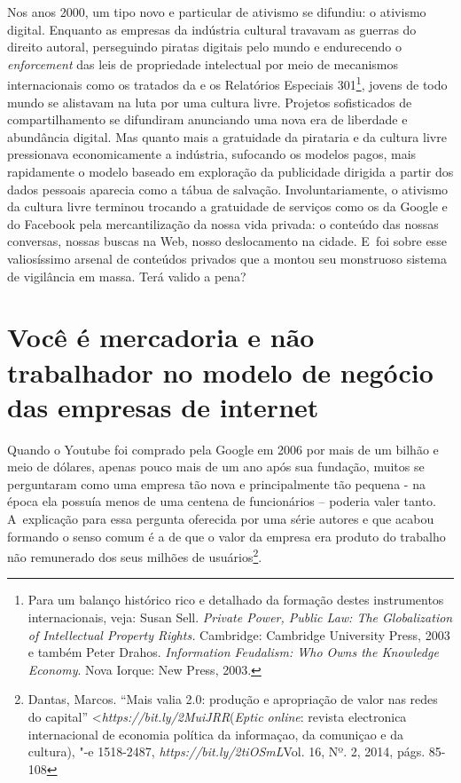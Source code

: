 Nos anos 2000, um tipo novo e particular de ativismo se difundiu: o
ativismo digital. Enquanto as empresas da indústria cultural travavam as
guerras do direito autoral, perseguindo piratas digitais pelo mundo e
endurecendo o \emph{enforcement} das leis de propriedade intelectual por
meio de mecanismos internacionais como os tratados da  e os
Relatórios Especiais 301\footnote{Para um balanço
  histórico rico e detalhado da formação destes instrumentos
  internacionais, veja: Susan Sell. \emph{Private Power, Public Law: The
  Globalization of Intellectual Property Rights.} Cambridge: Cambridge
  University Press, 2003 e também Peter Drahos. \emph{Information
  Feudalism: Who Owns the Knowledge Economy}. Nova Iorque: New Press,
  2003.}, jovens de todo mundo se alistavam na luta por uma cultura
livre. Projetos sofisticados de compartilhamento se difundiram
anunciando uma nova era de liberdade e abundância digital. Mas quanto
mais a gratuidade da pirataria e da cultura livre pressionava
economicamente a indústria, sufocando os modelos pagos, mais rapidamente
o modelo baseado em exploração da publicidade dirigida a partir dos
dados pessoais aparecia como a tábua de salvação. Involuntariamente, o
ativismo da cultura livre terminou trocando a gratuidade de serviços
como os da Google e do Facebook pela mercantilização da nossa vida
privada: o conteúdo das nossas conversas, nossas buscas na Web, nosso
deslocamento na cidade. E~foi sobre esse valiosíssimo arsenal de
conteúdos privados que a  montou seu monstruoso sistema de vigilância
em massa. Terá valido a pena?

\section{Você é mercadoria e não trabalhador no modelo de negócio das
empresas de internet}

Quando o Youtube foi comprado pela Google em 2006 por mais de um bilhão
e meio de dólares, apenas pouco mais de um ano após sua fundação, muitos
se perguntaram como uma empresa tão nova e principalmente tão pequena -
na época ela possuía menos de uma centena de funcionários -- poderia
valer tanto. A~explicação para essa pergunta oferecida por uma série
autores e que acabou formando o senso comum é a de que o valor da
empresa era produto do trabalho não remunerado dos seus milhões de
usuários\footnote{Dantas, Marcos. ``Mais valia 2.0:
  produção e apropriação de valor nas redes do capital''
  \textless{}\emph{https://bit.ly/2MuiJRR}(\emph{Eptic
    online}: revista electronica internacional de economia política da
  informaçao, da comuniçao e da cultura), "-e 1518-2487,
  \emph{https://bit.ly/2tiOSmL}{{Vol. 16, Nº. 2,
  2014}}, págs. 85-108}.

